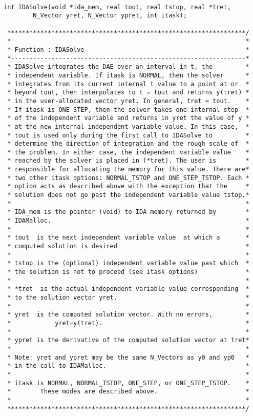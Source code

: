 \small
\begin{verbatim}

int IDASolve(void *ida_mem, real tout, real tstop, real *tret,
        N_Vector yret, N_Vector ypret, int itask);

 *****************************************************************/
 *                                                                *
 * Function : IDASolve                                            *
 *----------------------------------------------------------------*
 * IDASolve integrates the DAE over an interval in t, the         *
 * independent variable. If itask is NORMAL, then the solver      *
 * integrates from its current internal t value to a point at or  *
 * beyond tout, then interpolates to t = tout and returns y(tret) *
 * in the user-allocated vector yret. In general, tret = tout.    *
 * If itask is ONE_STEP, then the solver takes one internal step  *
 * of the independent variable and returns in yret the value of y *
 * at the new internal independent variable value. In this case,  *
 * tout is used only during the first call to IDASolve to         *
 * determine the direction of integration and the rough scale of  *
 * the problem. In either case, the independent variable value    *
 * reached by the solver is placed in (*tret). The user is        * 
 * responsible for allocating the memory for this value. There are*
 * two other itask options: NORMAL_TSTOP and ONE_STEP_TSTOP. Each *
 * option acts as described above with the exception that the     *
 * solution does not go past the independent variable value tstop.*
 *                                                                *
 * IDA_mem is the pointer (void) to IDA memory returned by        *
 * IDAMalloc.                                                     *
 *                                                                *
 * tout  is the next independent variable value  at which a       *
 * computed solution is desired                                   *
 *                                                                *
 * tstop is the (optional) independent variable value past which  *
 * the solution is not to proceed (see itask options)             *
 *                                                                *
 * *tret  is the actual independent variable value corresponding  *
 * to the solution vector yret.                                   *
 *                                                                *
 * yret  is the computed solution vector. With no errors,         *
 *            yret=y(tret).                                       *
 *                                                                *
 * ypret is the derivative of the computed solution vector at tret*
 *                                                                *
 * Note: yret and ypret may be the same N_Vectors as y0 and yp0   *
 * in the call to IDAMalloc.                                      *
 *                                                                *
 * itask is NORMAL, NORMAL_TSTOP, ONE_STEP, or ONE_STEP_TSTOP.    *
 *        These modes are described above.                        *
 *                                                                *
 *****************************************************************/
 

\end{verbatim}
